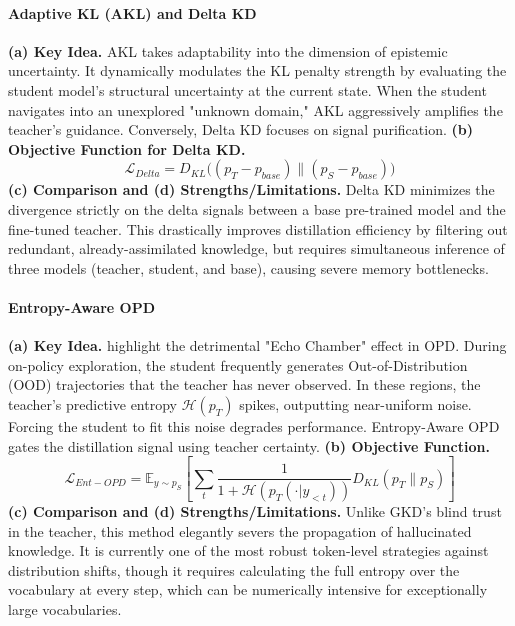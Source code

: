 \documentclass{article} %
\begin{document}
\paragraph{Adaptive KL (AKL) and Delta KD}
\textbf{(a) Key Idea.} AKL \citep{2410.14425} takes adaptability into the dimension of epistemic uncertainty. It dynamically modulates the KL penalty strength by evaluating the student model's structural uncertainty at the current state. When the student navigates into an unexplored "unknown domain," AKL aggressively amplifies the teacher's guidance.
Conversely, Delta KD \citep{2509.14526} focuses on signal purification.
\textbf{(b) Objective Function for Delta KD.}
\begin{equation}
    \mathcal{L}_{Delta} = D_{KL}\big( (p_T - p_{base}) \parallel (p_S - p_{base}) \big)
\end{equation}
\textbf{(c) Comparison and (d) Strengths/Limitations.} Delta KD minimizes the divergence strictly on the delta signals between a base pre-trained model and the fine-tuned teacher. This drastically improves distillation efficiency by filtering out redundant, already-assimilated knowledge, but requires simultaneous inference of three models (teacher, student, and base), causing severe memory bottlenecks.

\paragraph{Entropy-Aware OPD}
\textbf{(a) Key Idea.} \citet{2603.07079} highlight the detrimental "Echo Chamber" effect in OPD. During on-policy exploration, the student frequently generates Out-of-Distribution (OOD) trajectories that the teacher has never observed. In these regions, the teacher's predictive entropy $\mathcal{H}(p_T)$ spikes, outputting near-uniform noise. Forcing the student to fit this noise degrades performance. Entropy-Aware OPD gates the distillation signal using teacher certainty.
\textbf{(b) Objective Function.}
\begin{equation}
    \mathcal{L}_{Ent-OPD} = \mathbb{E}_{y \sim p_S} \left[ \sum_t \frac{1}{1 + \mathcal{H}(p_T(\cdot|y_{<t}))} D_{KL}(p_T \parallel p_S) \right]
\end{equation}
\textbf{(c) Comparison and (d) Strengths/Limitations.} Unlike GKD's blind trust in the teacher, this method elegantly severs the propagation of hallucinated knowledge. It is currently one of the most robust token-level strategies against distribution shifts, though it requires calculating the full entropy over the vocabulary at every step, which can be numerically intensive for exceptionally large vocabularies.
\end{document}
